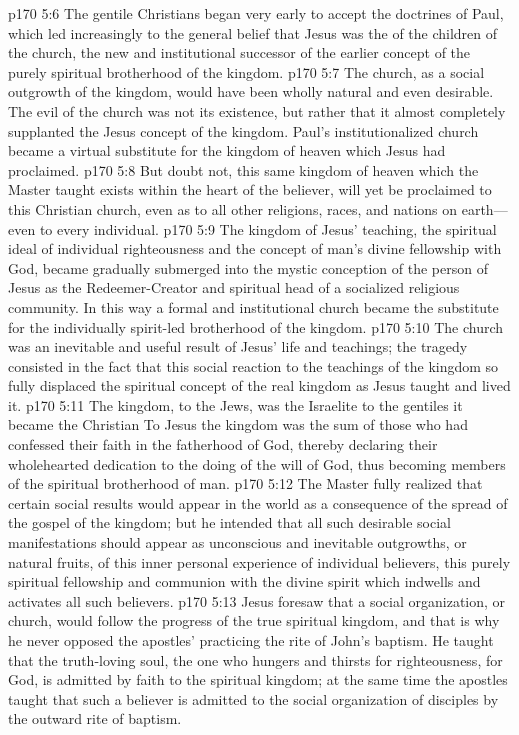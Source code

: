 \pc \vs p170 5:6 \bibnobreakspace The gentile Christians began very early to accept the doctrines of Paul, which led increasingly to the general belief that Jesus was the  of the children of the church, the new and institutional successor of the earlier concept of the purely spiritual brotherhood of the kingdom.
\pc \vs p170 5:7 The church, as a social outgrowth of the kingdom, would have been wholly natural and even desirable. The evil of the church was not its existence, but rather that it almost completely supplanted the Jesus concept of the kingdom. Paul’s institutionalized church became a virtual substitute for the kingdom of heaven which Jesus had proclaimed.
\vs p170 5:8 But doubt not, this same kingdom of heaven which the Master taught exists within the heart of the believer, will yet be proclaimed to this Christian church, even as to all other religions, races, and nations on earth---even to every individual.
\vs p170 5:9 The kingdom of Jesus’ teaching, the spiritual ideal of individual righteousness and the concept of man’s divine fellowship with God, became gradually submerged into the mystic conception of the person of Jesus as the Redeemer\hyp{}Creator and spiritual head of a socialized religious community. In this way a formal and institutional church became the substitute for the individually spirit\hyp{}led brotherhood of the kingdom.
\vs p170 5:10 The church was an inevitable and useful  result of Jesus’ life and teachings; the tragedy consisted in the fact that this social reaction to the teachings of the kingdom so fully displaced the spiritual concept of the real kingdom as Jesus taught and lived it.
\vs p170 5:11 The kingdom, to the Jews, was the Israelite  to the gentiles it became the Christian  To Jesus the kingdom was the sum of those  who had confessed their faith in the fatherhood of God, thereby declaring their wholehearted dedication to the doing of the will of God, thus becoming members of the spiritual brotherhood of man.
\vs p170 5:12 The Master fully realized that certain social results would appear in the world as a consequence of the spread of the gospel of the kingdom; but he intended that all such desirable social manifestations should appear as unconscious and inevitable outgrowths, or natural fruits, of this inner personal experience of individual believers, this purely spiritual fellowship and communion with the divine spirit which indwells and activates all such believers.
\vs p170 5:13 Jesus foresaw that a social organization, or church, would follow the progress of the true spiritual kingdom, and that is why he never opposed the apostles’ practicing the rite of John’s baptism. He taught that the truth\hyp{}loving soul, the one who hungers and thirsts for righteousness, for God, is admitted by faith to the spiritual kingdom; at the same time the apostles taught that such a believer is admitted to the social organization of disciples by the outward rite of baptism.
